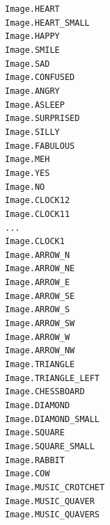 \setlength{\columnsep}{4pt}
\begin{multicols}{4}
	\texttt{Image.HEART}\\
	\texttt{Image.HEART\_SMALL}\\
	\texttt{Image.HAPPY}\\
	\texttt{Image.SMILE}\\
	\texttt{Image.SAD}\\
	\texttt{Image.CONFUSED}\\
	\texttt{Image.ANGRY}\\
	\texttt{Image.ASLEEP}\\
	\texttt{Image.SURPRISED}\\
	\texttt{Image.SILLY}\\
	\texttt{Image.FABULOUS}\\
	\texttt{Image.MEH}\\
	\texttt{Image.YES}\\
	\texttt{Image.NO}\\
	\texttt{Image.CLOCK12}\\
	\texttt{Image.CLOCK11}\\
	\texttt{...}\\
	\texttt{Image.CLOCK1}\\
	\texttt{Image.ARROW\_N}\\
	\texttt{Image.ARROW\_NE}\\
	\texttt{Image.ARROW\_E}\\
	\texttt{Image.ARROW\_SE}\\
	\texttt{Image.ARROW\_S}\\
	\texttt{Image.ARROW\_SW}\\
	\texttt{Image.ARROW\_W}\\
	\texttt{Image.ARROW\_NW}\\
	\texttt{Image.TRIANGLE}\\
	\texttt{Image.TRIANGLE\_LEFT}\\
	\texttt{Image.CHESSBOARD}\\
	\texttt{Image.DIAMOND}\\
	\texttt{Image.DIAMOND\_SMALL}\\
	\texttt{Image.SQUARE}\\
	\texttt{Image.SQUARE\_SMALL}\\
	\texttt{Image.RABBIT}\\
	\texttt{Image.COW}\\
	\texttt{Image.MUSIC\_CROTCHET}\\
	\texttt{Image.MUSIC\_QUAVER}\\
	\texttt{Image.MUSIC\_QUAVERS}\\

\end{multicols}
